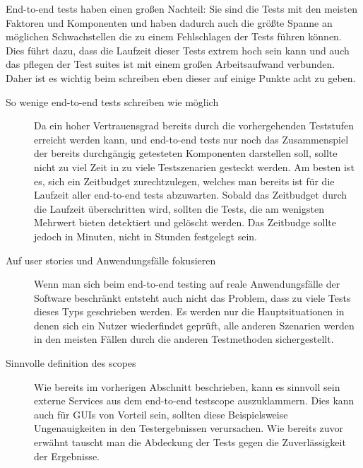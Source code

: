 \documentclass[12pt,a4paper,bibliography=totocnumbered,listof=totocnumbered]{scrartcl}
\begin{document}
End-to-end tests haben einen großen Nachteil: Sie sind die Tests mit den meisten Faktoren und Komponenten und haben dadurch auch die größte Spanne an möglichen Schwachstellen die zu einem Fehlschlagen der Tests führen können. Dies führt dazu, dass die Laufzeit dieser Tests extrem hoch sein kann und auch das pflegen der Test suites ist mit einem großen Arbeitsaufwand verbunden.\cite{clemson} Daher ist es wichtig beim schreiben eben dieser auf einige Punkte acht zu geben.

\begin{description}
	\item[So wenige end-to-end tests schreiben wie möglich] Da ein hoher Vertrauensgrad bereits durch die vorhergehenden Teststufen erreicht werden kann, und end-to-end tests nur noch das Zusammenspiel der bereits durchgängig getesteten Komponenten darstellen soll, sollte nicht zu viel Zeit in zu viele Testszenarien gesteckt werden. Am besten ist es, sich ein Zeitbudget zurechtzulegen, welches man bereits ist für die Laufzeit aller end-to-end tests abzuwarten. Sobald das Zeitbudget durch die Laufzeit überschritten wird, sollten die Tests, die am wenigsten Mehrwert bieten detektiert und gelöscht werden. Das Zeitbudge sollte jedoch in Minuten, nicht in Stunden festgelegt sein.\cite{clemson}	
	
	\item[Auf user stories und Anwendungsfälle fokusieren] Wenn man sich beim end-to-end testing auf reale Anwendungsfälle der Software beschränkt entsteht auch nicht das Problem, dass zu viele Tests dieses Typs geschrieben werden. Es werden nur die Hauptsituationen in denen sich ein Nutzer wiederfindet geprüft, alle anderen Szenarien werden in den meisten Fällen durch die anderen Testmethoden sichergestellt.\cite{clemson}
	
	\item[Sinnvolle definition des scopes] Wie bereits im vorherigen Abschnitt beschrieben, kann es sinnvoll sein externe Services aus dem end-to-end testscope auszuklammern. Dies kann auch für \acsp{GUI} von Vorteil sein, sollten diese Beispielsweise Ungenauigkeiten in den Testergebnissen verursachen. Wie bereits zuvor erwähnt tauscht man die Abdeckung der Tests gegen die Zuverlässigkeit der Ergebnisse.\cite{clemson}
	

\end{description}
\end{document}
